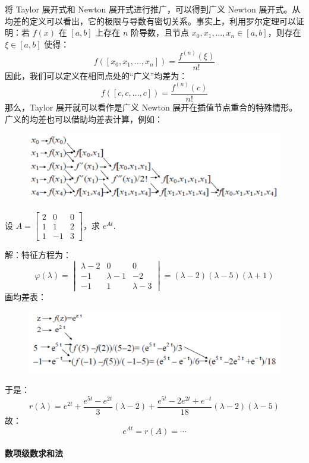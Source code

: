 将 Taylor 展开式和 Newton 展开式进行推广，可以得到广义 Newton 展开式。从均差的定义可以看出，它的极限与导数有密切关系。事实上，利用罗尔定理可以证明：若 $f(x)$ 在 $[a,b]$ 上存在 $n$ 阶导数，且节点 $x_0,x_1,\ldots,x_n\in[a,b]$，则存在 $\xi\in[a,b]$ 使得：
\[
    f([x_0,x_1,\ldots,x_n])=\frac{f^{(n)}(\xi)}{n!}
\]
因此，我们可以定义在相同点处的“广义”均差为：
\[
    f([c,c,\ldots,c])=\frac{f^{(n)}(c)}{n!}
\]
那么，Taylor 展开就可以看作是广义 Newton 展开在插值节点重合的特殊情形。
广义的均差也可以借助均差表计算，例如：
\begin{figure}[H]
    \centering
    \includegraphics[width=0.7\linewidth]{figs/diff2.png}
\end{figure}

\begin{example}
设 $A=\begin{bmatrix}2&0&0\\1&1&2\\1&-1&3\end{bmatrix}$，求 $e^{At}$.

解：特征方程为：
\[
    \varphi(\lambda)=\begin{vmatrix}\lambda-2&0&0\\-1&\lambda-1&-2\\-1&1&\lambda-3\end{vmatrix}=(\lambda-2)(\lambda-5)(\lambda+1)
\]
画均差表：
\begin{figure}[H]
    \centering
    \includegraphics[width=0.7\linewidth]{figs/diff-ex.png}
\end{figure}
于是：
\[
    r(\lambda)=e^{2t}+\frac{e^{5t}-e^{2t}}{3}(\lambda-2)+\frac{e^{5t}-2e^{2t}+e^{-t}}{18}(\lambda-2)(\lambda-5)
\]
故：
\[
    e^{At}=r(A)=\cdots
\]
\end{example}

\paragraph{数项级数求和法}

